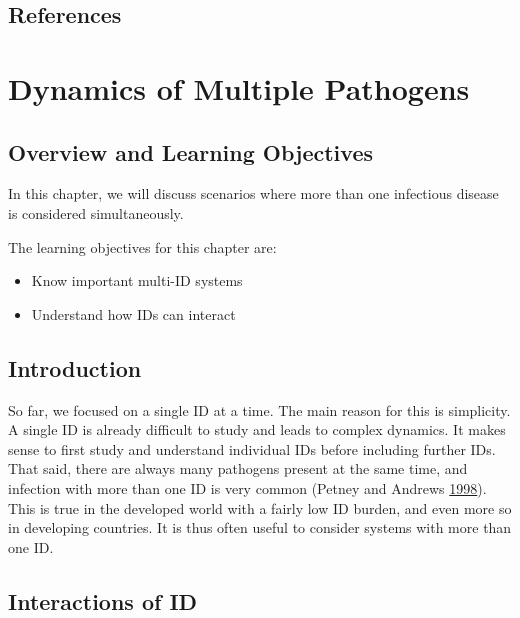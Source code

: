 \documentclass[]{article}
\providecommand{\tightlist}{%
  \setlength{\itemsep}{0pt}\setlength{\parskip}{0pt}}
\theoremstyle{definition}
\theoremstyle{definition}
\theoremstyle{definition}
\theoremstyle{remark}
\begin{document}
\subsection{References}\label{references-10}

\section{Dynamics of Multiple
Pathogens}\label{dynamics-of-multiple-pathogens}

\subsection{Overview and Learning
Objectives}\label{overview-and-learning-objectives-10}

In this chapter, we will discuss scenarios where more than one
infectious disease is considered simultaneously.

The learning objectives for this chapter are:

\begin{itemize}
\tightlist
\item
  Know important multi-ID systems
\item
  Understand how IDs can interact
\end{itemize}

\subsection{Introduction}\label{introduction-10}

So far, we focused on a single ID at a time. The main reason for this is
simplicity. A single ID is already difficult to study and leads to
complex dynamics. It makes sense to first study and understand
individual IDs before including further IDs. That said, there are always
many pathogens present at the same time, and infection with more than
one ID is very common (Petney and Andrews
\protect\hyperlink{ref-petney98}{1998}). This is true in the developed
world with a fairly low ID burden, and even more so in developing
countries. It is thus often useful to consider systems with more than
one ID.

\subsection{Interactions of ID}\label{interactions-of-id}
\end{document}

